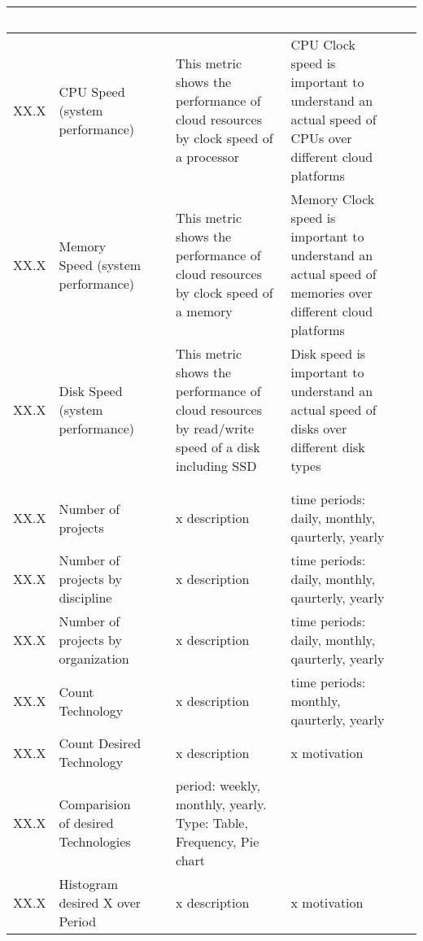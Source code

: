 \begin{table*}[p]
\begin{scriptsize}
\begin{center}
\begin{tabular}{lp{}p{}p{}p{}p{}}
~ \\
\hline
XX.X &
CPU Speed (system performance)&
~&
This metric shows the performance of cloud resources by clock speed of a processor &
CPU Clock speed is important to understand an actual speed of CPUs over different cloud platforms &
~ \\
\hline
XX.X &
Memory Speed (system performance)&
~&
This metric shows the performance of cloud resources by clock speed of a memory &
Memory Clock speed is important to understand an actual speed of memories over different cloud platforms &
~ \\
\hline
XX.X &
Disk Speed (system performance)&
~&
This metric shows the performance of cloud resources by read/write speed of a disk including SSD &
Disk speed is important to understand an actual speed of disks over different disk types&
~ \\
\hline
\rowcolor{blue!20} \multicolumn{6}{l}{\bf Project metrics} \\
\hline
 & & & & & \\
XX.X & Number of projects & ~ & x description & time periods: daily, monthly, qaurterly, yearly & ~ \\ \hline
XX.X & Number of projects by discipline & ~ & x description & time periods: daily, monthly, qaurterly, yearly & ~ \\ \hline
XX.X & Number of projects by organization & ~ & x description & time periods: daily, monthly, qaurterly, yearly & ~ \\ \hline
XX.X & Count Technology & ~ & x description & time periods: monthly, qaurterly, yearly & ~ \\ \hline
XX.X & Count Desired Technology & ~ & x description & x motivation &~\\ \hline
XX.X & Comparision of desired Technologies & ~ & period: weekly, monthly,
yearly. Type: Table, Frequency, Pie chart  &~\\ \hline
XX.X & Histogram desired X over Period & ~ & x description & x motivation &~\\ \hline
\hline
\end{tabular}
\end{center}
\end{scriptsize}
\end{table*}
